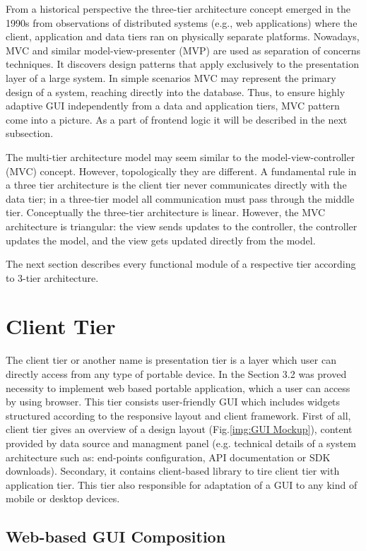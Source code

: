    From a historical perspective the three-tier architecture concept emerged in the 1990s from observations of distributed systems\cite{wiki:3tier} (e.g., web applications) where the client, application and data tiers ran on physically separate platforms. Nowadays, MVC and similar model-view-presenter (MVP) are used as separation of concerns techniques. It discovers design patterns that apply exclusively to the presentation layer of a large system. In simple scenarios MVC may represent the primary design of a system, reaching directly into the database. Thus, to ensure highly adaptive GUI independently from a data and application tiers, MVC pattern come into a picture. As a part of frontend logic it will be described in the next subsection.
  
  The multi-tier architecture model may seem similar to the model-view-controller (MVC) concept. However, topologically they are different. A fundamental rule in a three tier architecture is the client tier never communicates directly with the data tier; in a three-tier model all communication must pass through the middle tier. Conceptually the three-tier architecture is linear. However, the MVC architecture is triangular: the view sends updates to the controller, the controller updates the model, and the view gets updated directly from the model.

  The next section describes every functional module of a respective tier according to 3-tier architecture.

\section{Client Tier}
  The client tier or another name is presentation tier is a layer which user can directly access from any type of portable device. In the Section 3.2 was proved necessity to implement web based portable application, which a user can access by using browser. This tier consists user-friendly GUI which includes widgets structured according to the responsive layout and client framework. First of all, client tier gives an overview of a design layout (Fig.\ref{img:GUI Mockup}), content provided by data source and managment panel (e.g. technical details of a system architecture such as: end-points configuration, API documentation or SDK downloads). Secondary, it contains client-based library to tire client tier with application tier. This tier also responsible for adaptation of a GUI to any kind of mobile or desktop devices. 
  \subsection{Web-based GUI Composition}

